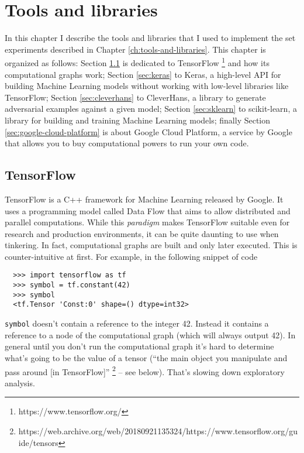 \chapter{Tools and libraries}

In this chapter I describe the tools and libraries that I used to implement
the set experiments described in Chapter \ref{ch:tools-and-libraries}. This
chapter is organized as follows: Section \ref{sec:tensorflow} is dedicated to
TensorFlow \footnote{https://www.tensorflow.org/} and how its computational graphs work;
Section \ref{sec:keras} to Keras, a high-level API for building
Machine Learning models without working with low-level libraries like
TensorFlow; Section \ref{sec:cleverhans} to CleverHans, a
library to generate adversarial examples against a given model;
Section \ref{sec:sklearn} to scikit-learn, a library for building
and training Machine Learning models;
finally Section \ref{sec:google-cloud-platform} is about Google Cloud
Platform, a service by Google that allows you to buy computational
powers to run your own code.

\section{TensorFlow}
\label{sec:tensorflow}

TensorFlow is a C++ framework for Machine Learning released by Google.
It uses a programming model called Data Flow that aims to allow
distributed and parallel computations. While this \emph{paradigm} makes
TensorFlow suitable even for research and production environments, it
can be quite daunting to use when tinkering. In fact, computational
graphs are built and only later executed. This is counter-intuitive at
first. For example, in the following snippet of code

\begin{verbatim}
  >>> import tensorflow as tf
  >>> symbol = tf.constant(42)
  >>> symbol 
  <tf.Tensor 'Const:0' shape=() dtype=int32>
\end{verbatim}

\texttt{symbol} doesn't contain a reference to the integer 42. Instead
it contains a reference to a node of the computational graph (which
will always output 42). In general until you don't run the
computational graph it's hard to determine what's going to be the value
of a tensor (``the main object you manipulate and pass around [in TensorFlow]''%
\footnote{https://web.archive.org/web/20180921135324/https://www.tensorflow.org/guide/tensors}
-- see below). That's slowing down exploratory analysis.


